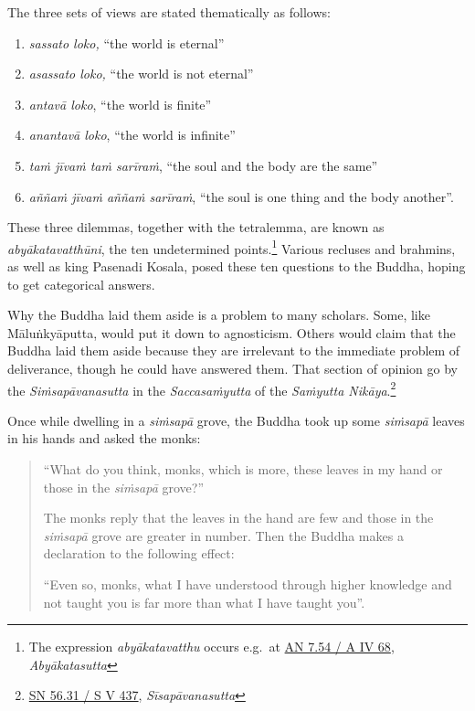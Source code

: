 The three sets of views are stated thematically as follows:

\begin{enumerate}
\def\labelenumi{\arabic{enumi}.}
\tightlist
\item
  \emph{sassato loko,} ``the world is eternal''
\item
  \emph{asassato loko,} ``the world is not eternal''
\item
  \emph{antavā loko}, ``the world is finite''
\item
  \emph{anantavā loko}, ``the world is infinite''
\item
  \emph{taṁ jīvaṁ taṁ sarīraṁ}, ``the soul and the body are the same''
\item
  \emph{aññaṁ jīvaṁ aññaṁ sarīraṁ}, ``the soul is one thing and the body another''.
\end{enumerate}

These three dilemmas, together with the tetralemma, are known as \emph{abyākatavatthūni}, the ten undetermined points.\footnote{The expression \emph{abyākatavatthu} occurs e.g.~at \href{https://suttacentral.net/an7.54/pli/ms}{AN 7.54 / A IV 68}, \emph{Abyākatasutta}} Various recluses and brahmins, as well as king Pasenadi Kosala, posed these ten questions to the Buddha, hoping to get categorical answers.

Why the Buddha laid them aside is a problem to many scholars. Some, like Māluṅkyāputta, would put it down to agnosticism. Others would claim that the Buddha laid them aside because they are irrelevant to the immediate problem of deliverance, though he could have answered them. That section of opinion go by the \emph{Siṁsapāvanasutta} in the \emph{Saccasaṁyutta} of the \emph{Saṁyutta Nikāya}.\footnote{\href{https://suttacentral.net/sn56.31/pli/ms}{SN 56.31 / S V 437}, \emph{Sīsapāvanasutta}}

Once while dwelling in a \emph{siṁsapā} grove, the Buddha took up some \emph{siṁsapā} leaves in his hands and asked the monks:

\begin{quote}
``What do you think, monks, which is more, these leaves in my hand or those in the \emph{siṁsapā} grove?''

The monks reply that the leaves in the hand are few and those in the \emph{siṁsapā} grove are greater in number. Then the Buddha makes a declaration to the following effect:

``Even so, monks, what I have understood through higher knowledge and not taught you is far more than what I have taught you''.
\end{quote}

